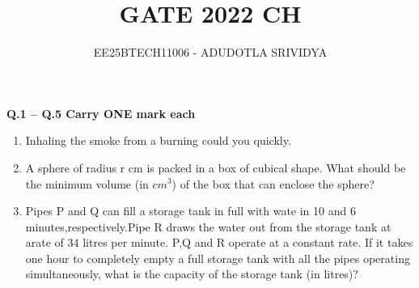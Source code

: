 \documentclass[journal]{IEEEtran}
\numberwithin{equation}{enumi}
\numberwithin{figure}{enumi}
\begin{document}

\vspace{3cm}

\title{GATE 2022 CH}
\author{EE25BTECH11006 - ADUDOTLA SRIVIDYA}
\maketitle
\noindent
\textbf{Q.1 -- Q.5 Carry ONE mark each}

\vspace{0.5cm}

\begin{enumerate}[start=1, label={Q\arabic*.}]

\item Inhaling the smoke from a burning \underline{\hspace{1.5cm}}could \underline{\hspace{1.5cm}}you quickly.
\begin{enumerate} 
  \end{enumerate}
\item A sphere of radius r cm is packed in a box of cubical shape. What should be the minimum volume (in $cm^3$) of the box that can enclose the sphere?
\begin{enumerate} 
  \end{enumerate}
\item Pipes P and Q can fill a storage tank in full with wate in 10 and 6 minutes,respectively.Pipe R draws the water out from the storage tank at arate of $34$ litres per minute. P,Q and R operate at a constant rate.
If it takes one hour to completely empty a full storage tank with all the pipes operating simultaneously, what is the capacity of the storage tank (in litres)?
\begin{enumerate} 
\end{enumerate}
\end{enumerate}
\end{document}
